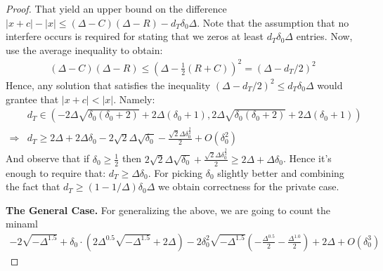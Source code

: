 \begin{proof}
That yield an upper bound on the difference $|x +c| - |x| \le  \left( \Delta -C \right) \left( \Delta -R \right) -  d_{T}\delta_{0}\Delta $. Note that the assumption that no interfere occurs is required for stating that we zeros at least $d_{T}\delta_{0}\Delta$ entries. Now, use the average inequality to obtain:   
\begin{equation*}
  \begin{split}
    \left( \Delta -C \right) \left( \Delta -R \right)  \le \left( \Delta - \frac{1}{2}\left( R+C \right)  \right)^{2}   = \left( \Delta - d_{T}/2 \right)^{2}
  \end{split}
\end{equation*}
Hence, any solution that satisfies the inequality $ \left( \Delta -d_{T}/2  \right)^{2} \le d_{T}\delta_{0}\Delta $ would grantee that $|x +c| < |x|$. Namely:
\begin{equation*}
  \begin{split}
   & d_{T} \in \left( - 2 \Delta \sqrt{\delta_{0} \left(\delta_{0} + 2\right)} + 2 \Delta \left(\delta_{0} + 1\right), 2 \Delta \sqrt{\delta_{0} \left(\delta_{0} + 2\right)} + 2 \Delta \left(\delta_{0} + 1\right)\right) \\
  \Rightarrow &  d_{T} \ge 2 \Delta + 2 \Delta \delta_{0} - 2 \sqrt{2} \Delta \sqrt{\delta_{0}} - \frac{\sqrt{2} \Delta \delta_{0}^{\frac{3}{2}}}{2} + O\left(\delta_{0}^{2}\right)
  \end{split}
\end{equation*}
And observe that if $\delta_{0} \ge \frac{1}{2}$ then $  2 \sqrt{2} \Delta \sqrt{\delta_{0}}  + \frac{\sqrt{2} \Delta \delta_{0}^{\frac{3}{2}}}{2} \ge 2\Delta + \Delta\delta_{0}$. Hence it's enough to require that: $d_{T} \ge \Delta \delta_{0}$. For picking $\delta_{0}$ slightly better and combining the fact that $d_{T} \ge \left( 1 - 1/\Delta \right)\delta_{0}\Delta$ we obtain correctness for the private case.  

\textbf{The General Case.} For generalizing the above, we are going to count the minaml 
\begin{equation*}
  \begin{split}
    - 2 \sqrt{- \Delta^{1.5}} + \delta_{0} \cdot \left(2 \Delta^{0.5} \sqrt{- \Delta^{1.5}} + 2 \Delta\right) - 2 \delta_{0}^{2} \sqrt{- \Delta^{1.5}} \left(- \frac{\Delta^{0.5}}{2} - \frac{\Delta^{1.0}}{2}\right) + 2 \Delta + O\left(\delta_{0}^{3}\right)
  \end{split}
\end{equation*}


\end{proof}
